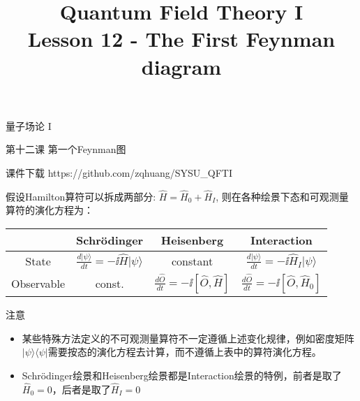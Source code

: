 \documentclass[CJK]{beamer}
\title{Quantum Field Theory I \\ Lesson 12 - The First Feynman diagram}
\author{}
\date{}
\begin{document}
\begin{frame}
 
\begin{center}
\begin{Large}
\bch
量子场论 I 

{\vskip 0.3in}

第十二课 第一个Feynman图

\ech
\end{Large}
\end{center}

\vskip 0.2in

\bch
课件下载
\ech
https://github.com/zqhuang/SYSU\_QFTI

\end{frame}


\begin{frame} 
\bch
假设Hamilton算符可以拆成两部分: $\hat{H} = \hat{H}_0 + \hat{H}_I$, 则在各种绘景下态和可观测量算符的演化方程为：

\begin{tabular}{c|c|c|c}
\hline
\hline
            & Schr\"odinger & Heisenberg  & Interaction \\
\hline
State         & $\frac{d |\psi\rangle}{dt} = - \ii \hat{H}|\psi\rangle$ & constant & $\frac{d |\psi\rangle}{dt} = - \ii \hat{H}_I|\psi\rangle$  \\
\hline
Observable & const. & $\frac{d\hat{O}}{dt} = -\ii [ \hat{O}, \hat{H} ]$ & $\frac{d\hat{O}}{dt} = -\ii [ \hat{O}, \hat{H}_0 ]$ \\
\hline
\end{tabular}

注意
\begin{itemize}
\item{某些特殊方法定义的不可观测量算符不一定遵循上述变化规律，例如密度矩阵$|\psi\rangle\langle\psi|$需要按态的演化方程去计算，而不遵循上表中的算符演化方程。}
\item{Schr\"odinger绘景和Heisenberg绘景都是Interaction绘景的特例，前者是取了$\hat{H}_0 = 0$，后者是取了$\hat{H}_I = 0$}
\end{itemize}

\ech
\end{frame}
\end{document}
